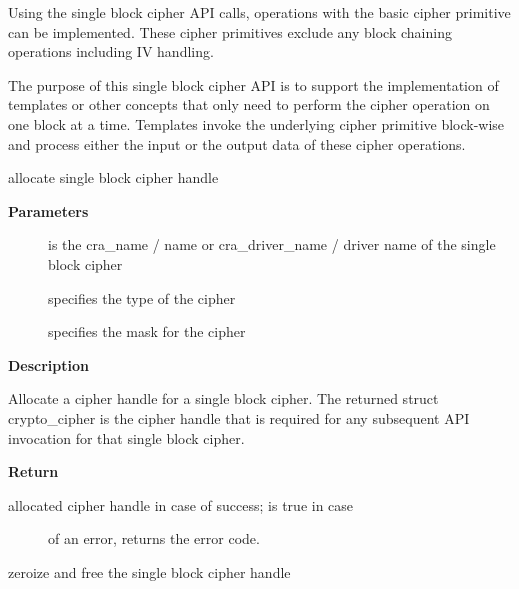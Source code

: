 \documentclass[a4paper,8pt,english]{sphinxmanual}
\begin{document}
Using the single block cipher API calls, operations with the basic cipher
primitive can be implemented. These cipher primitives exclude any block
chaining operations including IV handling.

The purpose of this single block cipher API is to support the implementation
of templates or other concepts that only need to perform the cipher operation
on one block at a time. Templates invoke the underlying cipher primitive
block-wise and process either the input or the output data of these cipher
operations.

\begin{fulllineitems}
\label{crypto/api-skcipher:c.crypto_alloc_cipher}
allocate single block cipher handle

\end{fulllineitems}


\textbf{Parameters}
\begin{description}
\item[{}] \leavevmode
is the cra\_name / name or cra\_driver\_name / driver name of the
single block cipher

\item[{}] \leavevmode
specifies the type of the cipher

\item[{}] \leavevmode
specifies the mask for the cipher

\end{description}

\textbf{Description}

Allocate a cipher handle for a single block cipher. The returned struct
crypto\_cipher is the cipher handle that is required for any subsequent API
invocation for that single block cipher.

\textbf{Return}
\begin{description}
\item[{allocated cipher handle in case of success;  is true in case}] \leavevmode
of an error,  returns the error code.

\end{description}

\begin{fulllineitems}
\label{crypto/api-skcipher:c.crypto_free_cipher}
zeroize and free the single block cipher handle

\end{fulllineitems}
\end{document}
